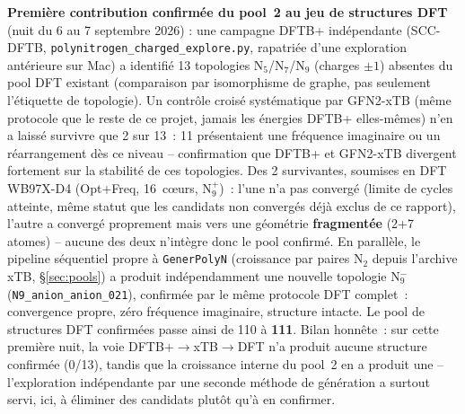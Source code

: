 \documentclass[11pt,a4paper]{article}
\begin{document}
\textbf{Premi\`ere contribution confirm\'ee du pool~2 au jeu de
structures DFT} (nuit du 6 au 7 septembre 2026) : une campagne DFTB+
ind\'ependante (SCC-DFTB, \texttt{polynitrogen\_charged\_explore.py},
rapatri\'ee d'une exploration ant\'erieure sur Mac) a identifi\'e 13
topologies N$_5$/N$_7$/N$_9$ (charges $\pm1$) absentes du pool DFT
existant (comparaison par isomorphisme de graphe, pas seulement
l'\'etiquette de topologie). Un contr\^ole crois\'e syst\'ematique par
GFN2-xTB (m\^eme protocole que le reste de ce projet, jamais les
\'energies DFTB+ elles-m\^emes) n'en a laiss\'e survivre que 2 sur 13~:
11 pr\'esentaient une fr\'equence imaginaire ou un r\'earrangement d\`es
ce niveau -- confirmation que DFTB+ et GFN2-xTB divergent fortement sur
la stabilit\'e de ces topologies. Des 2 survivantes, soumises en DFT
WB97X-D4 (Opt+Freq, 16~c\oe urs, N$_9^+$)~: l'une n'a pas converg\'e
(limite de cycles atteinte, m\^eme statut que les candidats non
convergés d\'ej\`a exclus de ce rapport), l'autre a converg\'e proprement
mais vers une g\'eom\'etrie \textbf{fragment\'ee} (2+7 atomes) -- aucune
des deux n'int\`egre donc le pool confirm\'e. En parall\`ele, le pipeline
s\'equentiel propre \`a \texttt{GenerPolyN} (croissance par paires
N$_2$ depuis l'archive xTB, \S\ref{sec:pools}) a produit ind\'ependamment
une nouvelle topologie N$_9^-$ (\texttt{N9\_anion\_anion\_021}), confirm\'ee
par le m\^eme protocole DFT complet~: convergence propre, z\'ero
fr\'equence imaginaire, structure intacte. Le pool de structures DFT
confirm\'ees passe ainsi de 110 \`a \textbf{111}. Bilan honn\^ete~: sur
cette premi\`ere nuit, la voie DFTB+$\to$xTB$\to$DFT n'a produit aucune
structure confirm\'ee (0/13), tandis que la croissance interne du
pool~2 en a produit une -- l'exploration ind\'ependante par une
seconde m\'ethode de g\'en\'eration a surtout servi, ici, \`a
\'eliminer des candidats plut\^ot qu'\`a en confirmer.
\end{document}
